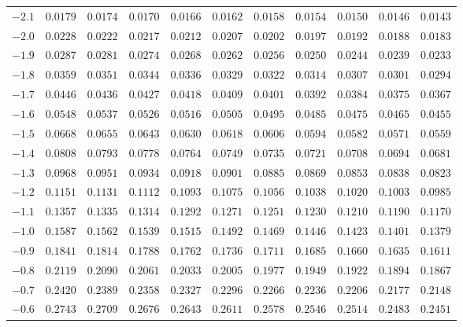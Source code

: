 \documentclass[
  11pt,
  a4paper,
  krantz2]{krantz}
\begin{document}
\begin{table}
\begin{tabular}{lrrrrrrrrrr}
$ -2.1 $ & $0.0179$ & $0.0174$ & $0.0170$ & $0.0166$ & $0.0162$ & $0.0158$ & $0.0154$ & $0.0150$ & $0.0146$ & $0.0143$\\
\vspace{3pt}
$ -2.0 $ & $0.0228$ & $0.0222$ & $0.0217$ & $0.0212$ & $0.0207$ & $0.0202$ & $0.0197$ & $0.0192$ & $0.0188$ & $0.0183$\\
$ -1.9 $ & $0.0287$ & $0.0281$ & $0.0274$ & $0.0268$ & $0.0262$ & $0.0256$ & $0.0250$ & $0.0244$ & $0.0239$ & $0.0233$\\
$ -1.8 $ & $0.0359$ & $0.0351$ & $0.0344$ & $0.0336$ & $0.0329$ & $0.0322$ & $0.0314$ & $0.0307$ & $0.0301$ & $0.0294$\\
$ -1.7 $ & $0.0446$ & $0.0436$ & $0.0427$ & $0.0418$ & $0.0409$ & $0.0401$ & $0.0392$ & $0.0384$ & $0.0375$ & $0.0367$\\
$ -1.6 $ & $0.0548$ & $0.0537$ & $0.0526$ & $0.0516$ & $0.0505$ & $0.0495$ & $0.0485$ & $0.0475$ & $0.0465$ & $0.0455$\\
\vspace{3pt}
$ -1.5 $ & $0.0668$ & $0.0655$ & $0.0643$ & $0.0630$ & $0.0618$ & $0.0606$ & $0.0594$ & $0.0582$ & $0.0571$ & $0.0559$\\
$ -1.4 $ & $0.0808$ & $0.0793$ & $0.0778$ & $0.0764$ & $0.0749$ & $0.0735$ & $0.0721$ & $0.0708$ & $0.0694$ & $0.0681$\\
$ -1.3 $ & $0.0968$ & $0.0951$ & $0.0934$ & $0.0918$ & $0.0901$ & $0.0885$ & $0.0869$ & $0.0853$ & $0.0838$ & $0.0823$\\
$ -1.2 $ & $0.1151$ & $0.1131$ & $0.1112$ & $0.1093$ & $0.1075$ & $0.1056$ & $0.1038$ & $0.1020$ & $0.1003$ & $0.0985$\\
$ -1.1 $ & $0.1357$ & $0.1335$ & $0.1314$ & $0.1292$ & $0.1271$ & $0.1251$ & $0.1230$ & $0.1210$ & $0.1190$ & $0.1170$\\
\vspace{3pt}
$ -1.0 $ & $0.1587$ & $0.1562$ & $0.1539$ & $0.1515$ & $0.1492$ & $0.1469$ & $0.1446$ & $0.1423$ & $0.1401$ & $0.1379$\\
$ -0.9 $ & $0.1841$ & $0.1814$ & $0.1788$ & $0.1762$ & $0.1736$ & $0.1711$ & $0.1685$ & $0.1660$ & $0.1635$ & $0.1611$\\
$ -0.8 $ & $0.2119$ & $0.2090$ & $0.2061$ & $0.2033$ & $0.2005$ & $0.1977$ & $0.1949$ & $0.1922$ & $0.1894$ & $0.1867$\\
$ -0.7 $ & $0.2420$ & $0.2389$ & $0.2358$ & $0.2327$ & $0.2296$ & $0.2266$ & $0.2236$ & $0.2206$ & $0.2177$ & $0.2148$\\
$ -0.6 $ & $0.2743$ & $0.2709$ & $0.2676$ & $0.2643$ & $0.2611$ & $0.2578$ & $0.2546$ & $0.2514$ & $0.2483$ & $0.2451$\\

\end{tabular}
\end{table}
\end{document}
